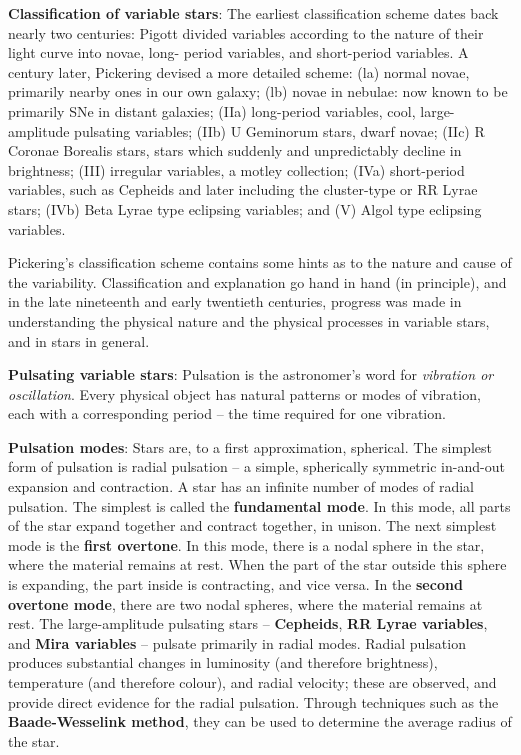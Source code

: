 \documentclass[a4paper,10pt]{article}
\begin{document}
{\noindent}\textbf{Classification of variable stars}: The earliest classification scheme dates back nearly two centuries: Pigott divided variables according to the nature of their light curve into novae, long- period variables, and short-period variables. A century later, Pickering devised a more detailed scheme: (la) normal novae, primarily nearby ones in our own galaxy; (lb) novae in nebulae: now known to be primarily SNe in distant galaxies; (IIa) long-period variables, cool, large-amplitude pulsating variables; (IIb) U Geminorum stars, dwarf novae; (IIc) R Coronae Borealis stars, stars which suddenly and unpredictably decline in brightness; (III) irregular variables, a motley collection; (IVa) short-period variables, such as Cepheids and later including the cluster-type or RR Lyrae stars; (IVb) Beta Lyrae type eclipsing variables; and (V) Algol type eclipsing variables.

{\noindent}Pickering's classification scheme contains some hints as to the nature and cause of the variability. Classification and explanation go hand in hand (in principle), and in the late nineteenth and early twentieth centuries, progress was made in understanding the physical nature and the physical processes in variable stars, and in stars in general.

{\noindent}\textbf{Pulsating variable stars}: Pulsation is the astronomer's word for \textit{vibration or oscillation}. Every physical object has natural patterns or modes of vibration, each with a corresponding period -- the time required for one vibration.

{\noindent}\textbf{Pulsation modes}: Stars are, to a first approximation, spherical. The simplest form of pulsation is radial pulsation -- a simple, spherically symmetric in-and-out expansion and contraction. A star has an infinite number of modes of radial pulsation. The simplest is called the \textbf{fundamental mode}. In this mode, all parts of the star expand together and contract together, in unison. The next simplest mode is the \textbf{first overtone}. In this mode, there is a nodal sphere in the star, where the material remains at rest. When the part of the star outside this sphere is expanding, the part inside is contracting, and vice versa. In the \textbf{second overtone mode}, there are two nodal spheres, where the material remains at rest. The large-amplitude pulsating stars -- \textbf{Cepheids}, \textbf{RR Lyrae variables}, and \textbf{Mira variables} -- pulsate primarily in radial modes. Radial pulsation produces substantial changes in luminosity (and therefore brightness), temperature (and therefore colour), and radial velocity; these are observed, and provide direct evidence for the radial pulsation. Through techniques such as the \textbf{Baade-Wesselink method}, they can be used to determine the average radius of the star.
\end{document}
